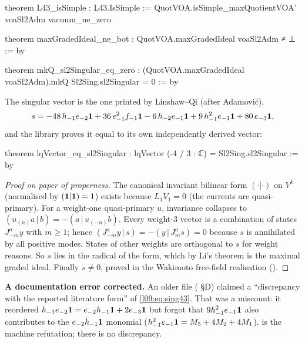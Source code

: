 \begin{leancode}
theorem L43_isSimple : L43.IsSimple :=
  QuotVOA.isSimple_maxQuotientVOA' voaSl2Adm vacuum_ne_zero
\end{leancode}
\begin{leancode}
theorem maxGradedIdeal_ne_bot : QuotVOA.maxGradedIdeal voaSl2Adm ≠ ⊥ := by
\end{leancode}
\begin{leancode}
theorem mkQ_sl2Singular_eq_zero :
    (QuotVOA.maxGradedIdeal voaSl2Adm).mkQ Sl2Sing.sl2Singular = 0 := by
\end{leancode}
The singular vector is the one printed by Linshaw--Qi (after Adamovi\'c),
\begin{equation}\label{l09:eq:sing43}
  s = -48\,h_{-1}e_{-2}\mathbf{1} + 36\,e_{-1}^2f_{-1}\mathbf{1} - 6\,h_{-2}e_{-1}\mathbf{1}
      + 9\,h_{-1}^2e_{-1}\mathbf{1} + 80\,e_{-3}\mathbf{1} ,
\end{equation}
and the library proves it equal to its own independently derived vector:
\begin{leancode}
theorem lqVector_eq_sl2Singular : lqVector (-4 / 3 : ℂ) = Sl2Sing.sl2Singular := by
\end{leancode}

\begin{proof}[Proof on paper of properness]
The canonical invariant bilinear form $(\cdot|\cdot)$ on $V^k$ (normalised by $(\mathbf{1}|\mathbf{1})=1$)
exists because $L_1V_1 = 0$ (the currents are quasi-primary). For a weight-one quasi-primary $u$,
invariance collapses to $(u_{(n)}a\,|\,b) = -(a\,|\,u_{(-n)}b)$. Every weight-3 vector is a combination of
states $J^a_{-m}y$ with $m\ge1$; hence $(J^a_{-m}y\,|\,s) = -(y\,|\,J^a_ms) = 0$ because $s$ is
annihilated by all positive modes. States of other weights are orthogonal to $s$ for weight reasons.
So $s$ lies in the radical of the form, which by Li's theorem is the maximal graded ideal. Finally
$s\neq0$, proved in the Wakimoto free-field realisation ().
\end{proof}

\begin{warning}
\textbf{A documentation error corrected.} An older file ( \S D)
claimed a ``discrepancy with the reported literature form'' of \eqref{l09:eq:sing43}. That was a
miscount: it reordered $h_{-1}e_{-2}\mathbf{1} = e_{-2}h_{-1}\mathbf{1} + 2e_{-3}\mathbf{1}$ but forgot that
$9h_{-1}^2e_{-1}\mathbf{1}$ also contributes to the $e_{-2}h_{-1}\mathbf{1}$ monomial
($h_{-1}^2e_{-1}\mathbf{1} = M_5+4M_2+4M_1$).  is the machine refutation;
there is no discrepancy.
\end{warning}

